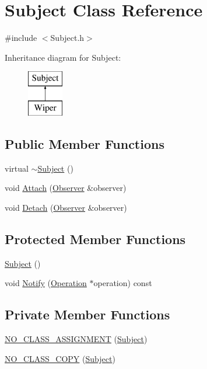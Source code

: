 \section{Subject Class Reference}
\label{class_subject}


{\ttfamily \#include $<$Subject.\-h$>$}

Inheritance diagram for Subject\-:\begin{figure}[H]
\begin{center}
\leavevmode
\includegraphics[height=2.000000cm]{class_subject}
\end{center}
\end{figure}
\subsection*{Public Member Functions}
\begin{DoxyCompactItemize}
\item 
virtual \hyperlink{class_subject_ae5980067d5ec5522db5a0d78100a34be}{$\sim$\-Subject} ()
\item 
void \hyperlink{class_subject_a7ddceeeccd20d79afb444b9c13296d94}{Attach} (\hyperlink{class_observer}{Observer} \&observer)
\item 
void \hyperlink{class_subject_a1040ad480940387831ed9b5b7113fcc2}{Detach} (\hyperlink{class_observer}{Observer} \&observer)
\end{DoxyCompactItemize}
\subsection*{Protected Member Functions}
\begin{DoxyCompactItemize}
\item 
\hyperlink{class_subject_ab468044832c824c6d6c2f46272655207}{Subject} ()
\item 
void \hyperlink{class_subject_ad5031f0b80193e419a3bddcdf05496f7}{Notify} (\hyperlink{class_operation}{Operation} $\ast$operation) const 
\end{DoxyCompactItemize}
\subsection*{Private Member Functions}
\begin{DoxyCompactItemize}
\item 
\hyperlink{class_subject_a2e839762e26672628bb3d6b96a5cc71c}{N\-O\-\_\-\-C\-L\-A\-S\-S\-\_\-\-A\-S\-S\-I\-G\-N\-M\-E\-N\-T} (\hyperlink{class_subject}{Subject})
\item 
\hyperlink{class_subject_a5a8ec250e4eee85f1911fa751305083d}{N\-O\-\_\-\-C\-L\-A\-S\-S\-\_\-\-C\-O\-P\-Y} (\hyperlink{class_subject}{Subject})
\end{DoxyCompactItemize}
